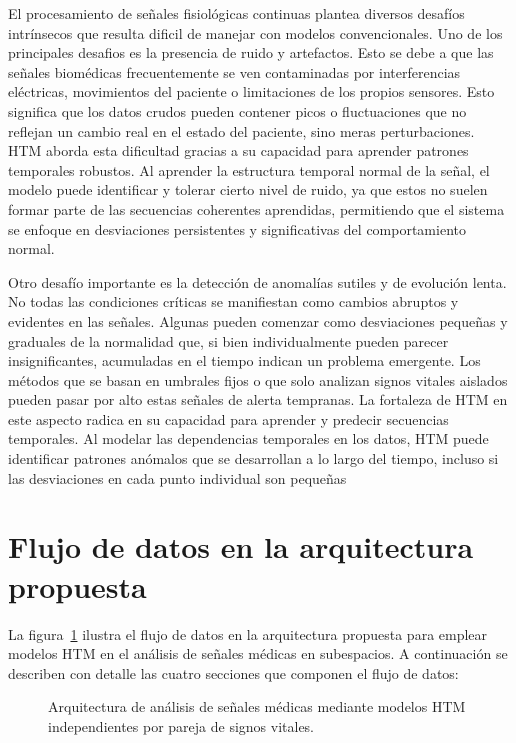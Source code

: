 El procesamiento de señales fisiológicas continuas plantea diversos desafíos intrínsecos que resulta dificil de manejar con modelos convencionales. Uno de los principales desafios es la presencia de ruido y artefactos. Esto se debe a que las señales biomédicas frecuentemente se ven contaminadas por interferencias eléctricas, movimientos del paciente o limitaciones de los propios sensores. Esto significa que los datos crudos pueden contener picos o fluctuaciones que no reflejan un cambio real en el estado del paciente, sino meras perturbaciones. HTM aborda esta dificultad gracias a su capacidad para aprender patrones temporales robustos. Al aprender la estructura temporal normal de la señal, el modelo puede identificar y tolerar cierto nivel de ruido, ya que estos no suelen formar parte de las secuencias coherentes aprendidas, permitiendo que el sistema se enfoque en desviaciones persistentes y significativas del comportamiento normal.

Otro desafío importante es la detección de anomalías sutiles y de evolución lenta. No todas las condiciones críticas se manifiestan como cambios abruptos y evidentes en las señales. Algunas pueden comenzar como desviaciones pequeñas y graduales de la normalidad que, si bien individualmente pueden parecer insignificantes, acumuladas en el tiempo indican un problema emergente. Los métodos que se basan en umbrales fijos o que solo analizan signos vitales aislados pueden pasar por alto estas señales de alerta tempranas. La fortaleza de HTM en este aspecto radica en su capacidad para aprender y predecir secuencias temporales. Al modelar las dependencias temporales en los datos, HTM puede identificar patrones anómalos que se desarrollan a lo largo del tiempo, incluso si las desviaciones en cada punto individual son pequeñas \parencite{AHMAD2017134}
\medskip

\section{Flujo de datos en la arquitectura propuesta}

La figura~\ref{fig:arquitectura_subespacios} ilustra el flujo de datos en la arquitectura propuesta para emplear modelos HTM en el análisis de señales médicas en subespacios. A continuación se describen con detalle las cuatro secciones que componen el flujo de datos:

\begin{figure}[ht]
  \centering
  
  \captionsetup{justification=centering}
  \caption{Arquitectura de análisis de señales médicas mediante modelos HTM independientes por pareja de signos vitales.}
  \label{fig:arquitectura_subespacios}
\end{figure}

